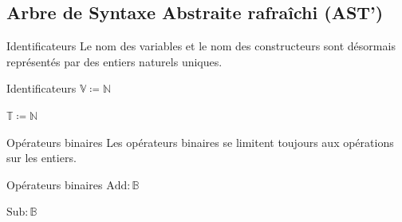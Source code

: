 \documentclass{beamer}
\begin{document}
\subsection{Arbre de Syntaxe Abstraite rafraîchi (AST')}

\begin{frame}{Identificateurs}
    Le nom des variables et le nom des constructeurs sont désormais représentés par des entiers naturels uniques.

    \begin{block}{Identificateurs}
        $\mathbb{V} \coloneqq \mathbb{N}$%

        $\mathbb{T} \coloneqq \mathbb{N}$%
    \end{block}
\end{frame}

\begin{frame}{Opérateurs binaires}
    Les opérateurs binaires se limitent toujours aux opérations sur les entiers.

    \begin{block}{Opérateurs binaires}
        $\text{Add} : \mathbb{B}$%

        $\text{Sub} : \mathbb{B}$%
    \end{block}
\end{frame}
\end{document}

